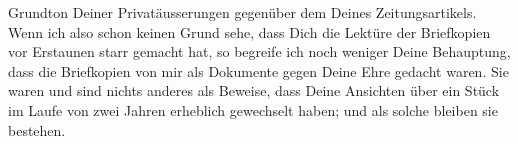                Grundton Deiner Privatäusserungen gegenüber dem Deines Zeitungsartikels. Wenn ich also schon
               keinen Grund sehe, dass Dich die Lektüre der Briefkopien vor Erstaunen starr gemacht
               hat, so begreife ich noch weniger Deine Behauptung, dass die Briefkopien von mir als
               Dokumente gegen Deine Ehre gedacht waren. Sie waren und sind nichts anderes als
               Beweise, dass Deine Ansichten über ein Stück im Laufe von zwei Jahren erheblich gewechselt haben;
               und als solche bleiben sie bestehen.\pend
           
